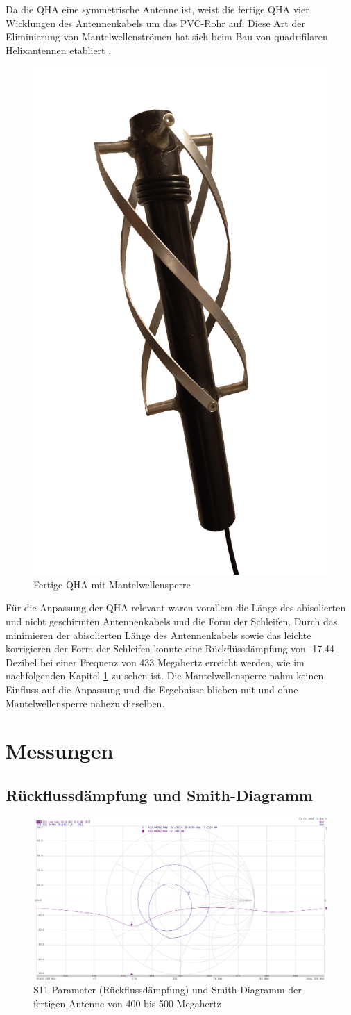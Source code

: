 Da die QHA eine symmetrische Antenne ist, weist die fertige QHA vier Wicklungen des Antennenkabels um das PVC-Rohr auf. Diese Art der Eliminierung von Mantelwellenströmen hat sich beim Bau von quadrifilaren Helixantennen etabliert \cite{noauthor_quadrifilar_nodate}. 

\begin{figure} [H]
	\centering
	\includegraphics[width=.25\linewidth]{../ref/qha_fertig.png}
	\caption{Fertige QHA mit Mantelwellensperre}
	\label{fig:fertig_qha}
\end{figure}

Für die Anpassung der QHA relevant waren vorallem die Länge des abisolierten und nicht geschirmten Antennenkabels und die Form der Schleifen. Durch das minimieren der abisolierten Länge des Antennenkabels sowie das leichte korrigieren der Form der Schleifen konnte eine Rückflüssdämpfung von -17.44 Dezibel bei einer Frequenz von 433 Megahertz erreicht werden, wie im nachfolgenden Kapitel \ref{sec:messungen_qha} zu sehen ist. Die Mantelwellensperre nahm keinen Einfluss auf die Anpassung und die Ergebnisse blieben mit und ohne Mantelwellensperre nahezu dieselben. 

\section{Messungen}
\label{sec:messungen_qha}
\subsection{Rückflussdämpfung und Smith-Diagramm}
\begin{figure} [H]
	\centering
	\includegraphics[width=\linewidth]{../ref/qfh_s11.png}
	\caption{S11-Parameter (Rückflussdämpfung) und Smith-Diagramm der fertigen Antenne von 400 bis 500 Megahertz}
	\label{fig:fertig_qha}
\end{figure}

